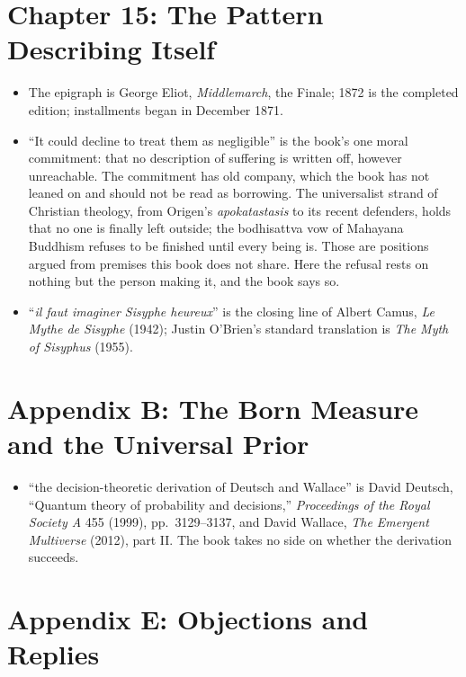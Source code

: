 \section*{Chapter 15: The Pattern Describing Itself}

\begin{itemize}
\setlength{\itemsep}{0.5em}
\item The epigraph is George Eliot, \textit{Middlemarch}, the Finale; 1872 is the completed edition; installments began in December 1871.
\item ``It could decline to treat them as negligible'' is the book's one moral commitment: that no description of suffering is written off, however unreachable. The commitment has old company, which the book has not leaned on and should not be read as borrowing. The universalist strand of Christian theology, from Origen's \textit{apokatastasis} to its recent defenders, holds that no one is finally left outside; the bodhisattva vow of Mahayana Buddhism refuses to be finished until every being is. Those are positions argued from premises this book does not share. Here the refusal rests on nothing but the person making it, and the book says so.
\item ``\textit{il faut imaginer Sisyphe heureux}'' is the closing line of Albert Camus, \textit{Le Mythe de Sisyphe} (1942); Justin O'Brien's standard translation is \textit{The Myth of Sisyphus} (1955).
\end{itemize}

\section*{Appendix B: The Born Measure and the Universal Prior}

\begin{itemize}
\setlength{\itemsep}{0.5em}
\item ``the decision-theoretic derivation of Deutsch and Wallace'' is David Deutsch, ``Quantum theory of probability and decisions,'' \textit{Proceedings of the Royal Society A} 455 (1999), pp.~3129--3137, and David Wallace, \textit{The Emergent Multiverse} (2012), part II. The book takes no side on whether the derivation succeeds.
\end{itemize}

\section*{Appendix E: Objections and Replies}

